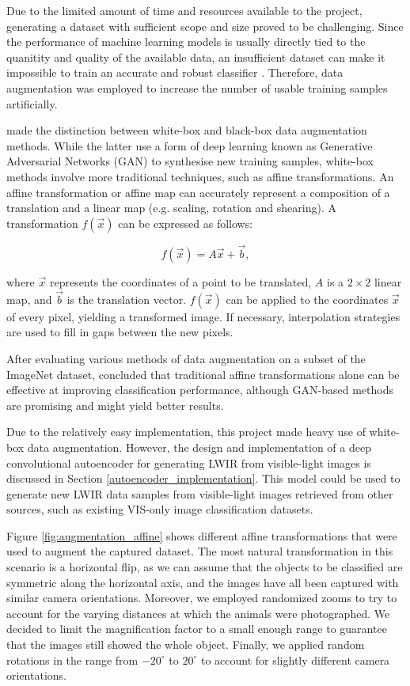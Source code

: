 \documentclass{l4proj}
\begin{document}
Due to the limited amount of time and resources available to the project, generating a dataset with sufficient scope and size proved to be challenging. Since the performance of machine learning models is usually directly tied to the quanitity and quality of the available data, an insufficient dataset can make it impossible to train an accurate and robust classifier \citep{fawzi_adaptive_2016}. Therefore, data augmentation was employed to increase the number of usable training samples artificially.

\citet{mikolajczyk_data_2018} made the distinction between white-box and black-box data augmentation methods. While the latter use a form of deep learning known as Generative Adversarial Networks (GAN) to synthesise new training samples, white-box methods involve more traditional techniques, such as affine transformations. An affine transformation or affine map can accurately represent a composition of a translation and a linear map (e.g. scaling, rotation and shearing). A transformation $f(\vec{x})$ can be expressed as follows:

\begin{equation}
  f(\vec{x}) = A \vec{x} + \vec{b},
  \label{eqn:affine}
\end{equation}

where $\vec{x}$ represents the coordinates of a point to be translated, $A$ is a $2 \times 2$ linear map, and $\vec{b}$ is the translation vector. $f(\vec{x})$ can be applied to the coordinates $\vec{x}$ of every pixel, yielding a transformed image. If necessary, interpolation strategies are used to fill in gaps between the new pixels.

After evaluating various methods of data augmentation on a subset of the ImageNet dataset, \citet{perez_effectiveness_2017} concluded that traditional affine transformations alone can be effective at improving classification performance, although GAN-based methods are promising and might yield better results.

Due to the relatively easy implementation, this project made heavy use of white-box data augmentation. However, the design and implementation of a deep convolutional autoencoder for generating LWIR from visible-light images is discussed in Section \ref{autoencoder_implementation}. This model could be used to generate new LWIR data samples from visible-light images retrieved from other sources, such as existing VIS-only image classification datasets.

Figure \ref{fig:augmentation_affine} shows different affine transformations that were used to augment the captured dataset. The most natural transformation in this scenario is a horizontal flip, as we can assume that the objects to be classified are symmetric along the horizontal axis, and the images have all been captured with similar camera orientations. Moreover, we employed randomized zooms to try to account for the varying distances at which the animals were photographed. We decided to limit the magnification factor to a small enough range to guarantee that the images still showed the whole object. Finally, we applied random rotations in the range from $-20^{\circ}$ to $20^{\circ}$ to account for slightly different camera orientations.
\end{document}
